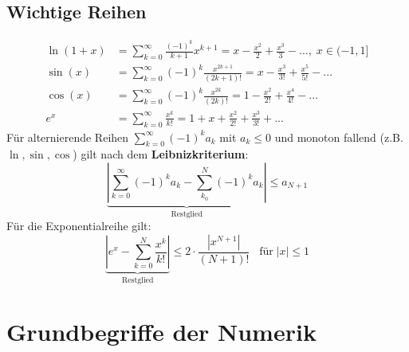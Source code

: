 \documentclass[4pt,a4paper]{scrartcl}
\begin{document}
\begin{multicols}{4}
\subsection{Wichtige Reihen}
\begin{equation*}
\begin{split}
\ln(1+x)&=\sum\limits_{k=0}^{\infty}\frac{(-1)^k}{k+1}x^{k+1}=x-\frac{x^2}{2}+\frac{x^3}{3}-...,\;x\in (-1,1]\\
\sin(x)&=\sum\limits_{k=0}^{\infty}(-1)^k\frac{x^{2k+1}}{(2k+1)!}=x-\frac{x^3}{3!}+\frac{x^5}{5!}-...\\
\cos(x)&=\sum\limits_{k=0}^{\infty}(-1)^k\frac{x^{2k}}{(2k)!}=1-\frac{x^2}{2!}+\frac{x^4}{4!}-...\\
e^x&=\sum_{k=0}^{\infty}\frac{x^k}{k!}=1+x+\frac{x^2}{2!}+\frac{x^3}{3!}+...
\end{split}
\end{equation*}
Für alternierende Reihen $\sum_{k=0}^{\infty}(-1)^ka_k$ mit $a_k\leq 0$ und monoton fallend (z.B. $\ln,\sin,\cos$) gilt nach dem \textbf{Leibnizkriterium}:
\begin{equation*}
\underbrace{\left|\sum_{k=0}^{\infty}(-1)^ka_k-\sum_{k_0}^{N}(-1)^ka_k\right|}_{\text{Restglied}}\leq a_{N+1}
\end{equation*}
Für die Exponentialreihe gilt:
\begin{equation*}
\underbrace{\left|e^x-\sum_{k=0}^{N}\frac{x^k}{k!}\right|}_{\text{Restglied}}\leq 2\cdot\frac{|x^{N+1}|}{(N+1)!}\;\;\;\text{für}\; |x|\leq 1
\end{equation*}

\section{Grundbegriffe der Numerik}


\end{multicols}
\end{document}
